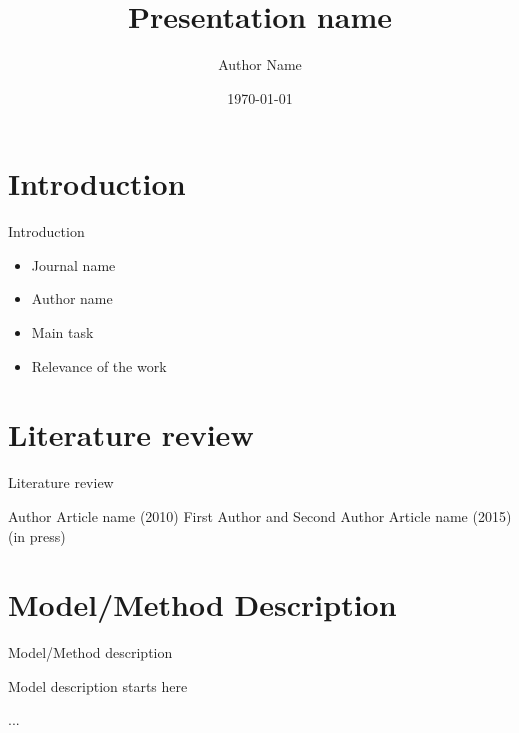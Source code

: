 \documentclass[11pt,pdf,unicode,slidestop,mathserif,notes=hide,
hyperref={colorlinks=false,bookmarksopen=true,bookmarksnumbered=true,bookmarksopenlevel=1,pdfstartview={FitH},pdfborder{0 0 0}}]{beamer}
\title[Short Name]{Presentation name}
\author[Author]{Author Name}
\date[\today]{\today}
\institute[CMF]{CMF MSU}
\begin{document}
\begin{frame}
 \titlepage
\end{frame}
\setcounter{framenumber}{0}

\section[Introduction]{Introduction}
\begin{frame}{Introduction}\label{Frame:Introduction}
 \begin{itemize}%
  \item Journal name
  \item Author name
  \item Main task
  \item Relevance of the work
 \end{itemize}
\end{frame}

\section[Review]{Literature review}
\begin{frame}{Literature review}%
  \begin{thebibliography}{10}
  \beamertemplatearticlebibitems
    Author
    \newblock Article name
     (2010)
  \beamertemplatearticlebibitems
    First Author and Second Author
    \newblock Article name
     (2015) (in press)
  \end{thebibliography}
\end{frame}

\section[Model]{Model/Method Description}
\begin{frame}\label{Frame:Description}
\begin{exampleblock}{Model/Method description}
\par Model description starts here
\par ...
\end{exampleblock}
\end{frame}
\end{document}
